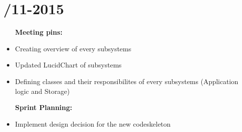 \section{/11-2015} %
\attend{\at}{\at}{\nat}{\at}


\begin{itemize}
	\item [\textbf{Meeting pins:}]
	\item Creating overview of every subsystems
	\item Updated LucidChart of subsystems
	\item Defining classes and their responsibilites of every subsystems (Application logic and Storage)
\end{itemize}

\begin{itemize}
	\item [\textbf{Sprint Planning:}]
	\item Implement design decision for the new codeskeleton
\end{itemize}